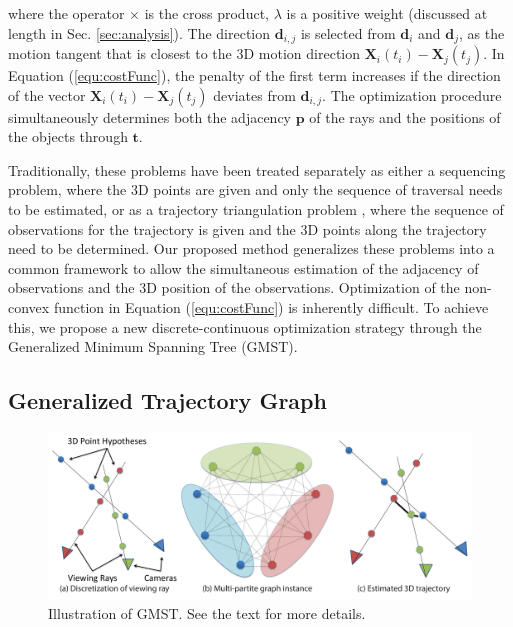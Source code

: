 where the operator $\times$ is the cross product, $\lambda$ is a positive weight (discussed at length in Sec. \ref{sec:analysis}). The direction $\mathbf{d}_{i,j}$ is selected from $\mathbf{d}_i$ and $\mathbf{d}_j$, as the motion tangent that is closest to the 3D motion direction $\mathbf{X}_i(t_i)-\mathbf{X}_j(t_j)$.
In Equation (\ref{equ:costFunc}), the penalty of the first term increases if the direction of the vector $\mathbf{X}_i(t_i)-\mathbf{X}_j(t_j)$ deviates from $\mathbf{d}_{i,j}$.
The optimization procedure simultaneously determines both the adjacency $\mathbf{p}$ of the rays and the positions of the objects through $\mathbf{t}$.

Traditionally, these problems have been treated separately as either a sequencing problem,
where the 3D points are given and only the sequence of traversal needs to be estimated, or as a trajectory triangulation problem \cite{Park_ECCV2010,Valmadre_CVPR2012}, where the sequence of observations for the trajectory is given and the 3D points along the trajectory need to be determined. Our proposed method generalizes these problems into a common framework to allow the simultaneous estimation of the adjacency of observations and the 3D position of the observations. %
Optimization of the non-convex function in Equation (\ref{equ:costFunc}) is inherently difficult. To achieve this, we propose a new discrete-continuous  optimization strategy through the Generalized Minimum Spanning Tree (GMST).

\subsection{Generalized Trajectory Graph}
\begin{figure}[t]
\centering
    \includegraphics[width=1\columnwidth]{chapter4/resource/gmst_eccv.pdf}
\caption[Illustration of the generalized minimum spanning tree (GMST)]{Illustration of GMST. See the text for more details.}
\label{fig:gmst}
\end{figure}

